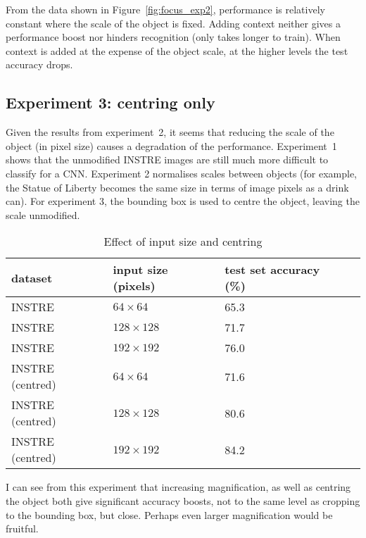 From the data shown in Figure~\ref{fig:focus_exp2}, performance is relatively constant where the scale of the object is fixed. Adding context neither gives a performance boost nor hinders recognition (only takes longer to train). When context is added at the expense of the object scale, at the higher levels the test accuracy drops.


\subsection {Experiment 3: centring only}

Given the results from experiment~2, it seems that reducing the scale of the object (in pixel size) causes a degradation of the performance. Experiment~1 shows that the unmodified INSTRE images are still much more difficult to classify for a CNN. Experiment 2 normalises scales between objects (for example, the Statue of Liberty becomes the same size in terms of image pixels as a drink can). For experiment 3, the bounding box is used to centre the object, leaving the scale unmodified.


\begin{table}[h]
  \centering
    \caption{Effect of input size and centring}
    
  \begin{tabular}{ l l l l }
    
    dataset & input size (pixels) & test set accuracy (\%) \\
    \toprule
    
    INSTRE &  $ 64 \times 64 $ & 65.3 \\
    INSTRE &  $ 128 \times 128 $  & 71.7 \\
    INSTRE &  $ 192 \times 192 $  & 76.0 \\
    
    \toprule
    INSTRE (centred) &  $ 64 \times 64 $ & 71.6 \\
    INSTRE (centred) &  $ 128 \times 128 $  & 80.6 \\
    INSTRE (centred) &  $ 192 \times 192 $  & 84.2 \\
    
    
    
    \bottomrule
  \end{tabular}
\label{fig:focus_input_size}
\end{table}



I can see from this experiment that increasing magnification, as well as centring the object both give significant accuracy boosts, not to the same level as cropping to the bounding box, but close. Perhaps even larger magnification would be fruitful. 

